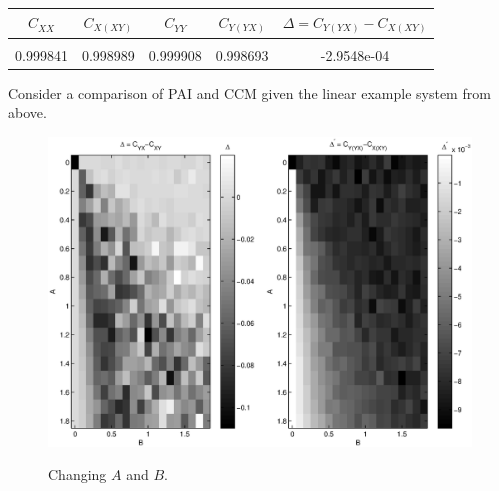 \documentclass{article}
\begin{document}
\begin{tabular}{c|c|c|c|c}
$C_{XX}$ & $C_{X(XY)}$ & $C_{YY}$ & $C_{Y(YX)}$ & $\Delta=C_{Y(YX)}-C_{X(XY)}$ \\
\hline \\
0.999841 & 0.998989 & 0.999908 & 0.998693 & -2.9548e-04
\end{tabular}

Consider a comparison of PAI and CCM given the linear example system from above.  
\begin{figure}[H]
\includegraphics[scale=0.8]{LinearEx_PAItemp.eps} \\
\caption{Changing $A$ and $B$.}
\label{fig1}
\end{figure}
\end{document}
